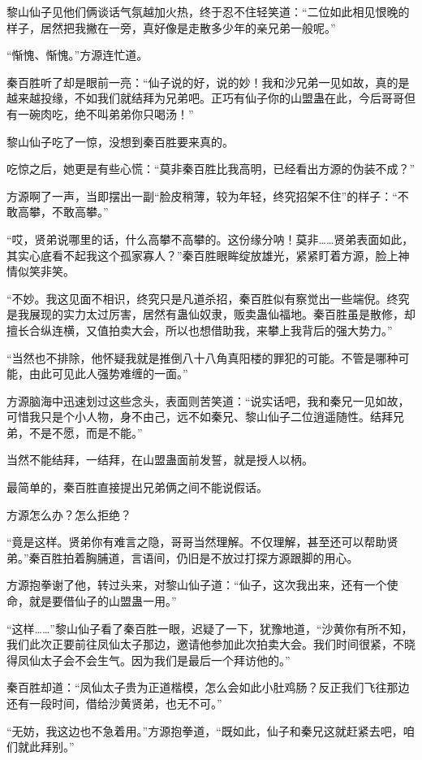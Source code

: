\begin{this_body}
黎山仙子见他们俩谈话气氛越加火热，终于忍不住轻笑道：“二位如此相见恨晚的样子，居然把我撇在一旁，真好像是走散多少年的亲兄弟一般呢。”

“惭愧、惭愧。”方源连忙道。

秦百胜听了却是眼前一亮：“仙子说的好，说的妙！我和沙兄弟一见如故，真的是越来越投缘，不如我们就结拜为兄弟吧。正巧有仙子你的山盟蛊在此，今后哥哥但有一碗肉吃，绝不叫弟弟你只喝汤！”

黎山仙子吃了一惊，没想到秦百胜要来真的。

吃惊之后，她更是有些心慌：“莫非秦百胜比我高明，已经看出方源的伪装不成？”

方源啊了一声，当即摆出一副“脸皮稍薄，较为年轻，终究招架不住”的样子：“不敢高攀，不敢高攀。”

“哎，贤弟说哪里的话，什么高攀不高攀的。这份缘分呐！莫非……贤弟表面如此，其实心底看不起我这个孤家寡人？”秦百胜眼眸绽放雄光，紧紧盯着方源，脸上神情似笑非笑。

“不妙。我这见面不相识，终究只是凡道杀招，秦百胜似有察觉出一些端倪。终究是我展现的实力太过厉害，居然有蛊仙奴隶，贩卖蛊仙福地。秦百胜虽是散修，却擅长合纵连横，又值拍卖大会，所以也想借助我，来攀上我背后的强大势力。”

“当然也不排除，他怀疑我就是推倒八十八角真阳楼的罪犯的可能。不管是哪种可能，由此可见此人强势难缠的一面。”

方源脑海中迅速划过这些念头，表面则苦笑道：“说实话吧，我和秦兄一见如故，可惜我只是个小人物，身不由己，远不如秦兄、黎山仙子二位逍遥随性。结拜兄弟，不是不愿，而是不能。”

当然不能结拜，一结拜，在山盟蛊面前发誓，就是授人以柄。

最简单的，秦百胜直接提出兄弟俩之间不能说假话。

方源怎么办？怎么拒绝？

“竟是这样。贤弟你有难言之隐，哥哥当然理解。不仅理解，甚至还可以帮助贤弟。”秦百胜拍着胸脯道，言语间，仍旧是不放过打探方源跟脚的用心。

方源抱拳谢了他，转过头来，对黎山仙子道：“仙子，这次我出来，还有一个使命，就是要借仙子的山盟蛊一用。”

“这样……”黎山仙子看了秦百胜一眼，迟疑了一下，犹豫地道，“沙黄你有所不知，我们此次正要前往凤仙太子那边，邀请他参加此次拍卖大会。我们时间很紧，不晓得凤仙太子会不会生气。因为我们是最后一个拜访他的。”

秦百胜却道：“凤仙太子贵为正道楷模，怎么会如此小肚鸡肠？反正我们飞往那边还有一段时间，借给沙黄贤弟，也无不可。”

“无妨，我这边也不急着用。”方源抱拳道，“既如此，仙子和秦兄这就赶紧去吧，咱们就此拜别。”


\end{this_body}
